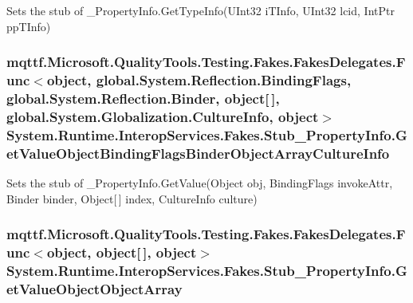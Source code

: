 Sets the stub of \-\_\-\-Property\-Info.\-Get\-Type\-Info(\-U\-Int32 i\-T\-Info, U\-Int32 lcid, Int\-Ptr pp\-T\-Info)

\hypertarget{class_system_1_1_runtime_1_1_interop_services_1_1_fakes_1_1_stub___property_info_a67b6d38d44c79d4516e88b8aa8bd77e9}{
\subsubsection[{Get\-Value\-Object\-Binding\-Flags\-Binder\-Object\-Array\-Culture\-Info}]{\setlength{\rightskip}{0pt plus 5cm}mqttf.\-Microsoft.\-Quality\-Tools.\-Testing.\-Fakes.\-Fakes\-Delegates.\-Func$<$object, global.\-System.\-Reflection.\-Binding\-Flags, global.\-System.\-Reflection.\-Binder, object\mbox{[}$\,$\mbox{]}, global.\-System.\-Globalization.\-Culture\-Info, object$>$ System.\-Runtime.\-Interop\-Services.\-Fakes.\-Stub\-\_\-\-Property\-Info.\-Get\-Value\-Object\-Binding\-Flags\-Binder\-Object\-Array\-Culture\-Info}}\label{class_system_1_1_runtime_1_1_interop_services_1_1_fakes_1_1_stub___property_info_a67b6d38d44c79d4516e88b8aa8bd77e9}


Sets the stub of \-\_\-\-Property\-Info.\-Get\-Value(\-Object obj, Binding\-Flags invoke\-Attr, Binder binder, Object\mbox{[}$\,$\mbox{]} index, Culture\-Info culture)

\hypertarget{class_system_1_1_runtime_1_1_interop_services_1_1_fakes_1_1_stub___property_info_ad08a304baaee94609538ef97f9836413}{
\subsubsection[{Get\-Value\-Object\-Object\-Array}]{\setlength{\rightskip}{0pt plus 5cm}mqttf.\-Microsoft.\-Quality\-Tools.\-Testing.\-Fakes.\-Fakes\-Delegates.\-Func$<$object, object\mbox{[}$\,$\mbox{]}, object$>$ System.\-Runtime.\-Interop\-Services.\-Fakes.\-Stub\-\_\-\-Property\-Info.\-Get\-Value\-Object\-Object\-Array}}\label{class_system_1_1_runtime_1_1_interop_services_1_1_fakes_1_1_stub___property_info_ad08a304baaee94609538ef97f9836413}


